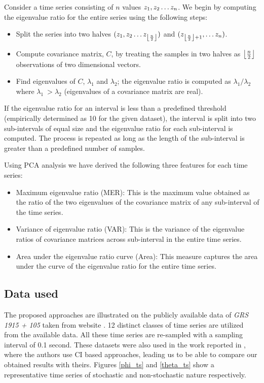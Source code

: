 \documentclass[journal]{IEEEtran}
\DeclarePairedDelimiter\floor{\lfloor}{\rfloor}
\begin{document}
Consider a time series consisting of $n$ values  $z_1, z_2 \mathellipsis z_n$. We begin by computing the eigenvalue ratio for the entire series using the following steps:
\begin{itemize}
\item  Split the series into two halves $(z_1, z_2 \mathellipsis z_{\floor*{\frac{n}{2}}})$ and $(z_{\floor*{\frac{n}{2}} + 1}, \mathellipsis z_n)$.
\item Compute covariance matrix, $C$,  by treating the samples in two halves as $\floor*{\frac{n}{2}}$ observations of two dimensional vectors.
\item Find eigenvalues of $C$, $\lambda_1$ and $\lambda_2$; the eigenvalue ratio is computed as  $\lambda_1/\lambda_2$ where $\lambda_1 \ > \lambda_2$ (eigenvalues of a covariance matrix are real).
\end{itemize}
If the eigenvalue ratio for an interval is less than a predefined threshold (empirically determined as 10 for the given dataset), the interval is split into two sub-intervals of equal size and the eigenvalue ratio for each sub-interval is computed. The process is repeated as long as the length of the sub-interval is greater than a predefined number of samples.

Using PCA analysis we have derived the following three features for each time series:
\begin{itemize}
\item Maximum eigenvalue ratio (MER): This is the maximum value obtained as the ratio of the two eigenvalues of the covariance matrix of any sub-interval of the time series.
\item Variance of eigenvalue ratio (VAR): This is the variance of the eigenvalue ratios of covariance matrices across sub-interval in the entire time series.
\item Area under the eigenvalue ratio curve (Area): This measure captures the area under the curve of the eigenvalue ratio for the entire time series.
\end{itemize}

\subsection{Data used}
The proposed approaches are illustrated on the publicly available data of \textit{GRS 1915 + 105} taken from website \cite{xte}. 12 distinct classes of time series are utilized from the available data. All these time series are re-sampled with a sampling interval of 0.1 second. These datasets  were  also used in the work reported in \cite{Adegoke2018}, where the authors use CI based approaches, leading us to be able to compare our obtained results with theirs. Figures \ref{phi_ts} and \ref{theta_ts} show a representative time series of stochastic and non-stochastic  nature respectively.
\end{document}
